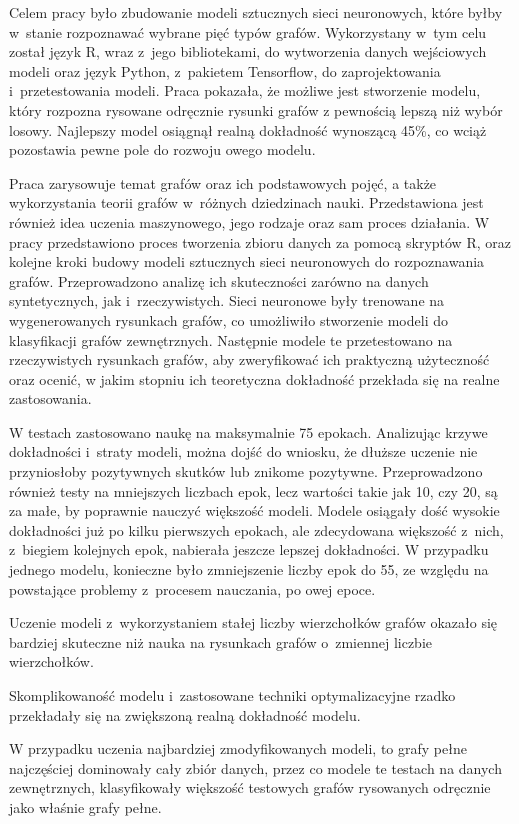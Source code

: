 Celem pracy było zbudowanie modeli sztucznych sieci neuronowych,
które byłby w~stanie rozpoznawać wybrane pięć typów grafów.
Wykorzystany w~tym celu został język R, wraz z~jego bibliotekami, do wytworzenia danych wejściowych modeli
oraz język Python, z~pakietem Tensorflow, do zaprojektowania i~przetestowania modeli.
Praca pokazała, że możliwe jest stworzenie modelu, który rozpozna rysowane odręcznie rysunki grafów
z pewnością lepszą niż wybór losowy.
Najlepszy model osiągnął realną dokładność wynoszącą 45\%,
co wciąż pozostawia pewne pole do rozwoju owego modelu.

Praca zarysowuje temat grafów oraz ich podstawowych pojęć,
a także wykorzystania teorii grafów w~różnych dziedzinach nauki.
Przedstawiona jest również idea uczenia maszynowego,
jego rodzaje oraz sam proces działania.
W pracy przedstawiono proces tworzenia zbioru danych za pomocą skryptów R,
oraz kolejne kroki budowy modeli sztucznych sieci neuronowych do rozpoznawania grafów.
Przeprowadzono analizę ich skuteczności zarówno na danych syntetycznych, jak i~rzeczywistych.
Sieci neuronowe były trenowane na wygenerowanych rysunkach grafów,
co umożliwiło stworzenie modeli do klasyfikacji grafów zewnętrznych.
Następnie modele te przetestowano na rzeczywistych rysunkach grafów,
aby zweryfikować ich praktyczną użyteczność oraz ocenić,
w jakim stopniu ich teoretyczna dokładność przekłada się na realne zastosowania.

W testach zastosowano naukę na maksymalnie 75 epokach.
Analizując krzywe dokładności i~straty modeli, można dojść do wniosku,
że dłuższe uczenie nie przyniosłoby pozytywnych skutków lub znikome pozytywne.
Przeprowadzono również testy na mniejszych liczbach epok, lecz wartości takie jak 10, czy 20,
są za małe, by poprawnie nauczyć większość modeli.
Modele osiągały dość wysokie dokładności już po kilku pierwszych epokach,
ale zdecydowana większość z~nich, z~biegiem kolejnych epok, nabierała jeszcze lepszej dokładności.
W przypadku jednego modelu, konieczne było zmniejszenie liczby epok do 55,
ze względu na powstające problemy z~procesem nauczania, po owej epoce.

Uczenie modeli z~wykorzystaniem stałej liczby wierzchołków grafów okazało się bardziej skuteczne
niż nauka na rysunkach grafów o~zmiennej liczbie wierzchołków.

Skomplikowaność modelu i~zastosowane techniki optymalizacyjne rzadko przekładały się na zwiększoną realną dokładność modelu.

W przypadku uczenia najbardziej zmodyfikowanych modeli, to grafy pełne najczęściej dominowały cały zbiór danych,
przez co modele te testach na danych zewnętrznych,
klasyfikowały większość testowych grafów rysowanych odręcznie jako właśnie grafy pełne.

